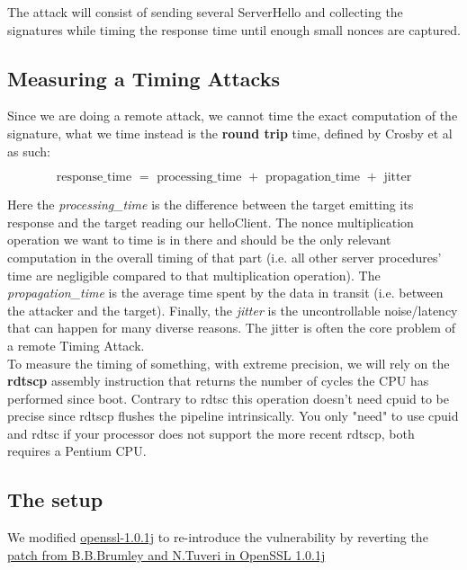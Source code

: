 \documentclass[a4paper,11pt]{article}
\begin{document}
The attack will consist of sending several ServerHello and collecting the signatures while timing the response time until enough small nonces are captured.

\subsection{Measuring a Timing Attacks}

Since we are doing a remote attack, we cannot time the exact computation of the signature, what we time instead is the \textbf{round trip} time, defined by Crosby et al\cite{crosby} as such:

$$ \text{response\_time } = \text{ processing\_time } + \text{ propagation\_time } + \text{ jitter} $$

Here the \textit{processing\_time} is the difference between the target emitting its response and the target reading our helloClient. The nonce multiplication operation we want to time is in there and should be the only relevant computation in the overall timing of that part (i.e. all other server procedures' time are negligible compared to that multiplication operation). The \textit{propagation\_time} is the average time spent by the data in transit (i.e. between the attacker and the target). Finally, the \textit{jitter} is the uncontrollable noise/latency that can happen for many diverse reasons. The jitter is often the core problem of a remote Timing Attack.\\

To measure the timing of something, with extreme precision, we will rely on the \textbf{rdtscp} assembly instruction that returns the number of cycles the CPU has performed since boot. Contrary to rdtsc this operation doesn't need cpuid to be precise since rdtscp flushes the pipeline intrinsically. You only "need" to use cpuid and rdtsc if your processor does not support the more recent rdtscp, both requires a Pentium CPU.

\subsection{The setup}

We modified \href{ftp://ftp.openssl.org/source/old/1.0.1/openssl-1.0.1j.tar.gz}{openssl-1.0.1j} to re-introduce the vulnerability by reverting the \href{https://git.openssl.org/?p=openssl.git;a=blobdiff;f=CHANGES;h=1633d27975c91f122c4e9266b2c3cf4e56e8ffbf;hp=22749650b701d91cc43af24a226369116c2a46f8;hb=992bdde62d2eea57bb85935a0c1a0ef0ca59b3da;hpb=bbcf3a9b300bc8109bb306a53f6f3445ba02e8e9}{patch from B.B.Brumley and N.Tuveri in OpenSSL 1.0.1j}
\end{document}
